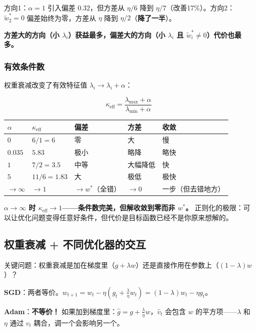 \documentclass[12pt,a4paper]{article}
\begin{document}
方向1：$\alpha=1$ 引入偏差 $0.32$，但方差从 $\eta/6$ 降到 $\eta/7$（改善17\%）。方向2：$\tilde{w}^*_2 = 0$ 偏差始终为零，方差从 $\eta$ 降到 $\eta/2$（\textbf{降了一半}）。

\textbf{方差大的方向（小 $\lambda_i$）获益最多，偏差大的方向（小 $\lambda_i$ 且 $\tilde{w}^*_i \neq 0$）代价也最多。}

\subsubsection{有效条件数}

权重衰减改变了有效特征值 $\lambda_i \to \lambda_i + \alpha$：

\[\kappa_{\text{eff}} = \frac{\lambda_{\max} + \alpha}{\lambda_{\min} + \alpha}\]

\begin{center}\small
\begin{longtable}{|l|l|l|l|l|}
\hline
$\alpha$ & $\kappa_{\text{eff}}$ & 偏差 & 方差 & 收敛 \\
\hline
$0$ & $6/1 = 6$ & 零 & 大 & 慢 \\
$0.035$ & $5.83$ & 极小 & 略降 & 略快 \\
$1$ & $7/2 = 3.5$ & 中等 & 大幅降低 & 快 \\
$5$ & $11/6 = 1.83$ & 大 & 极低 & 极快 \\
$\to\infty$ & $\to 1$ & $\to w^*$（全错） & $\to 0$ & 一步（但去错地方） \\
\hline
\end{longtable}
\end{center}

\textbf{$\alpha \to \infty$ 时 $\kappa_{\text{eff}} \to 1$——条件数完美，但解收敛到零而非 $w^*$。} 正则化的极限：可以让优化问题变得任意好条件，但代价是目标函数已经不是你原来想解的。


\subsection{权重衰减 + 不同优化器的交互}

关键问题：权重衰减是加在梯度里（$g + \lambda w$）还是直接作用在参数上（$(1-\lambda)w$）？

\textbf{SGD}：两者等价。$w_{t+1} = w_t - \eta(g_t + \frac{\lambda}{\eta}w_t) = (1-\lambda)w_t - \eta g_t$。

\textbf{Adam}：\textbf{不等价！} 如果加到梯度里：$\hat{g} = g + \frac{\lambda}{\eta}w$，$\hat{v}_t$ 会包含 $w$ 的平方项——$\lambda$ 和 $\eta$ 通过 $v_t$ 耦合，调一个会影响另一个。
\end{document}
